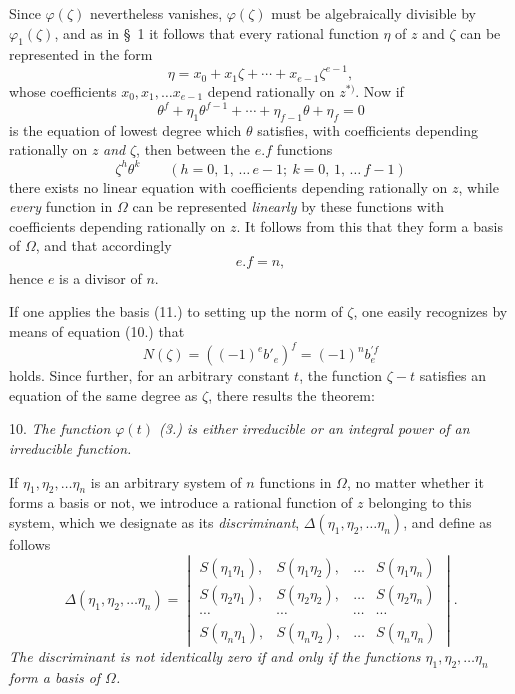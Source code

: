 \documentclass{article}
\begin{document}
Since $\varphi(\zeta)$ nevertheless vanishes, $\varphi(\zeta)$ must be algebraically divisible by $\varphi_{1}(\zeta)$, and as in §~1 it follows that every rational function $\eta$ of $z$ and $\zeta$ can be represented in the form
\[ \eta = x_{0} + x_{1}\zeta + \cdots + x_{e-1}\zeta^{e-1}, \]
whose coefficients $x_{0}, x_{1}, \ldots x_{e-1}$ depend rationally on $z$${}^{*)}$. Now if
\[ \theta^{f} + \eta_{1}\theta^{f-1} + \cdots + \eta_{f-1}\theta + \eta_{f} = 0 \]
is the equation of lowest degree which $\theta$ satisfies, with coefficients depending rationally on $z$ \emph{and} $\zeta$, then between the $e.f$ functions
\[ \zeta^{h}\theta^{k} \qquad {\scriptstyle (h = 0,\, 1,\, \ldots\, e-1;\ k = 0,\, 1,\, \ldots\, f-1)} \tag{11.} \]
there exists no linear equation with coefficients depending rationally on $z$, while \emph{every} function in $\Omega$ can be represented \emph{linearly} by these functions with coefficients depending rationally on $z$. It follows from this that they form a basis of $\Omega$, and that accordingly
\[ e.f = n, \]
hence $e$ is a divisor of $n$.

If one applies the basis (11.) to setting up the norm of $\zeta$, one easily recognizes by means of equation (10.) that
\[ N(\zeta) = ((-1)^{e}b'_{e})^{f} = (-1)^{n}b_{e}^{\prime f} \]
holds. Since further, for an arbitrary constant $t$, the function $\zeta-t$ satisfies an equation of the same degree as $\zeta$, there results the theorem:

10. \emph{The function $\varphi(t)$ (3.) is either irreducible or an integral power of an irreducible function.}

If $\eta_{1}, \eta_{2}, \ldots \eta_{n}$ is an arbitrary system of $n$ functions in $\Omega$, no matter whether it forms a basis or not, we introduce a rational function of $z$ belonging to this system, which we designate as its \emph{discriminant}, $\Delta(\eta_{1}, \eta_{2}, \ldots \eta_{n})$, and define as follows
\[ \Delta(\eta_{1}, \eta_{2}, \ldots \eta_{n}) = \begin{vmatrix} S(\eta_{1}\eta_{1}), & S(\eta_{1}\eta_{2}), & \ldots & S(\eta_{1}\eta_{n}) \\ S(\eta_{2}\eta_{1}), & S(\eta_{2}\eta_{2}), & \ldots & S(\eta_{2}\eta_{n}) \\ \cdots & \cdots & \cdots & \cdots \\ S(\eta_{n}\eta_{1}), & S(\eta_{n}\eta_{2}), & \ldots & S(\eta_{n}\eta_{n}) \end{vmatrix}. \tag{12.} \]
\emph{The discriminant is not identically zero if and only if the functions $\eta_{1}, \eta_{2}, \ldots \eta_{n}$ form a basis of $\Omega$.}
\end{document}
